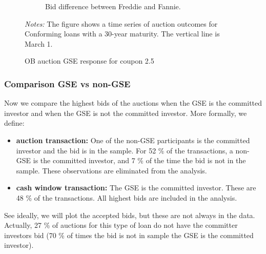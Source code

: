 \documentclass[11pt,a4paper]{article}
\begin{document}
\begin{figure}[h]
\begin{subfigure}[b]{0.49\textwidth}
      \caption{ Bid difference between Freddie and Fannie.}
     \end{subfigure}
     \caption{OB auction  GSE response for coupon 2.5 } 
   \begin{minipage}{\textwidth}
      \footnotesize{\textit{Notes:} The figure shows a time series of auction outcomes for Conforming loans with a 30-year maturity. The vertical line is March 1.  } 
      \end{minipage}
\end{figure}

\pagebreak
\subsubsection{Comparison GSE vs non-GSE}

Now we compare the highest bids of the auctions when the GSE is the committed investor and when the GSE is not the committed investor. More formally, we define: 

\begin{itemize}
  \item \textbf{auction transaction: } One of the non-GSE participants is the committed investor and the bid is in the sample. For 52 \% of the transactions, a non-GSE is the committed investor, and 7 \% of the time the bid is not in the sample. These observations are eliminated from the analysis.
  \item \textbf{cash window transaction: } The GSE is the committed investor. These are 48 \% of the transactions. All highest bids are included in the analysis. 
\end{itemize}

See ideally, we will plot the accepted bids, but these are not always in the data. Actually, 27 \% of auctions for this type of loan do not have the committer investors bid (70 \%  of times the bid is not in sample the GSE is the committed investor). 
\end{document}
